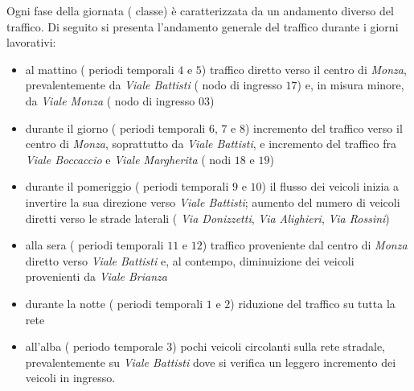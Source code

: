 Ogni fase della giornata (\ie{} classe) è caratterizzata da un andamento diverso del traffico. Di seguito si presenta l'andamento generale del traffico durante i giorni lavorativi:
\begin{itemize}
	\item al mattino (\ie{} periodi temporali $4$ e $5$) traffico diretto verso il centro di \emph{Monza}, prevalentemente da \emph{Viale Battisti} (\ie{} nodo di ingresso $17$) e, in misura minore, da \emph{Viale Monza} (\ie{} nodo di ingresso $03$)
	\item durante il giorno (\ie{} periodi temporali $6$, $7$ e $8$) incremento del traffico verso il centro di \emph{Monza}, soprattutto da \emph{Viale Battisti}, e incremento del traffico fra \emph{Viale Boccaccio} e \emph{Viale Margherita} (\ie{} nodi $18$ e $19$)
	\item durante il pomeriggio (\ie{} periodi temporali $9$ e $10$) il flusso dei veicoli inizia a invertire la sua direzione verso \emph{Viale Battisti}; aumento del numero di veicoli diretti verso le strade laterali (\eg{} \emph{Via Donizzetti}, \emph{Via Alighieri}, \emph{Via Rossini})
	\item alla sera (\ie{} periodi temporali $11$ e $12$) traffico proveniente dal centro di \emph{Monza} diretto verso \emph{Viale Battisti} e, al contempo, diminuizione dei veicoli provenienti da \emph{Viale Brianza}
	\item durante la notte (\ie{} periodi temporali $1$ e $2$) riduzione del traffico su tutta la rete
	\item all'alba (\ie{} periodo temporale $3$) pochi veicoli circolanti sulla rete stradale, prevalentemente su \emph{Viale Battisti} dove si verifica un leggero incremento dei veicoli in ingresso.
\end{itemize}


